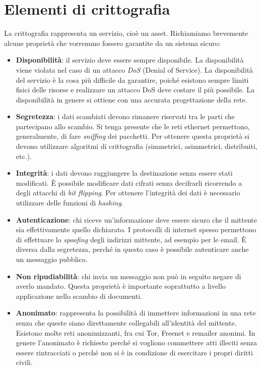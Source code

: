 \chapter{Elementi di crittografia}
La crittografia rappresenta un servizio, cioè un asset. Richiamiamo brevemente alcune proprietà che vorremmo fossero garantite da un sistema sicuro:
\begin{itemize}
	\item \textbf{Disponibilità}: il servizio deve essere sempre disponibile. La disponibilità viene violata nel caso di un attacco \textit{DoS} (Denial of Service). La disponibilità del servizio è la cosa più difficile da garantire, poiché esistono sempre limiti fisici delle risorse e realizzare un attacco DoS deve costare il più possibile. La disponibilità in genere si ottiene con una accurata progettazione della rete.
	\item \textbf{Segretezza}: i dati scambiati devono rimanere riservati tra le parti che partecipano allo scambio. Si tenga presente che le reti ethernet permettono, generalmente, di fare \textit{sniffing} dei pacchetti. Per ottenere questa proprietà si devono utilizzare algoritmi di crittografia (simmetrici, asimmetrici, distribuiti, etc.).
	\item \textbf{Integrità}: i dati devono raggiungere la destinazione senza essere stati modificati. È possibile modificare dati cifrati senza decifrarli ricorrendo a degli attacchi di \textit{bit flipping}. Per ottenere l'integrità dei dati è necessario utilizzare delle funzioni di \textit{hashing}.
	\item \textbf{Autenticazione}: chi riceve un'informazione deve essere sicuro che il mittente sia effettivamente quello dichiarato. I protocolli di internet spesso permettono di effettuare lo \textit{spoofing} degli	indirizzi mittente, ad esempio per le email. È diversa dalla segretezza, perché in questo caso è possibile autenticare anche un messaggio pubblico.
	\item \textbf{Non ripudiabilità}: chi invia un messaggio non può in seguito negare di averlo mandato. Questa proprietà è importante soprattutto a livello applicazione nello scambio di documenti.
	\item \textbf{Anonimato}: rappresenta la possibilità di immettere informazioni in una rete senza che queste siano direttamente collegabili all'identità del mittente. Esistono molte reti anonimizzanti, fra cui Tor, Freenet e remailer anonimi. In genere l'anonimato è richiesto perché si vogliono commettere atti illeciti senza essere rintracciati o perché non si è in condizione di esercitare i propri diritti civili.
\end{itemize}

